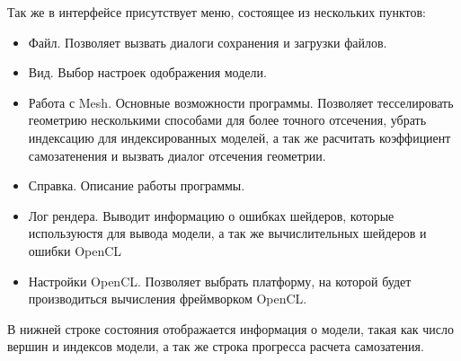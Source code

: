 Так же в интерфейсе присутствует меню, состоящее из нескольких пунктов:
\begin{itemize}
\item Файл. Позволяет вызвать диалоги сохранения и загрузки файлов.
\item Вид. Выбор настроек одображения модели.
\item Работа с Mesh. Основные возможности программы. Позволяет тесселировать геометрию несколькими способами для более точного отсечения, убрать индексацию для индексированных моделей, а так же расчитать коэффициент самозатенения и вызвать диалог отсечения геометрии.
\item Справка. Описание работы программы.
\item Лог рендера. Выводит информацию о ошибках шейдеров, которые используюстя для вывода модели, а так же вычислительных шейдеров и ошибки OpenCL
\item Настройки OpenCL. Позволяет выбрать платформу, на которой будет производиться вычисления фреймворком OpenCL.
\end{itemize}

В нижней строке состояния отображается информация о модели, такая как число вершин и индексов модели, а так же строка прогресса расчета самозатения.

